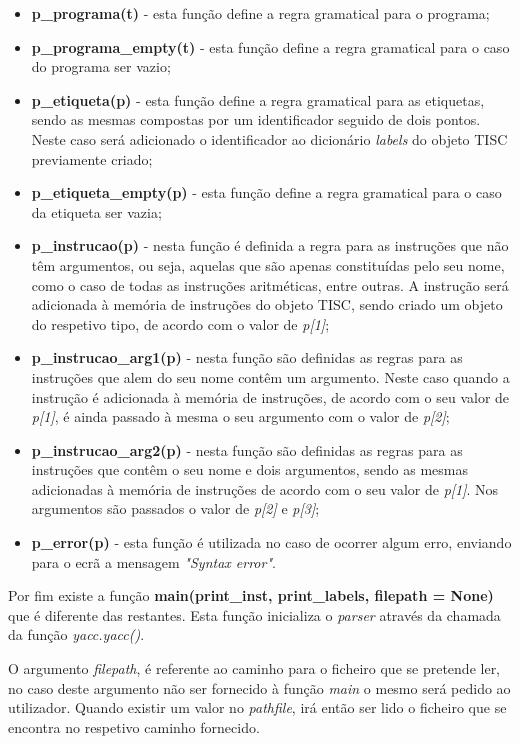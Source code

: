 \documentclass[titlepage,11pt,svgnames]{article}   %
\begin{document}
\begin{itemize}
\item \textbf{p\_programa(t)} - esta função define a regra gramatical para o programa;
\item \textbf{p\_programa\_empty(t)} - esta função define a regra gramatical para o caso do programa ser vazio;
\item \textbf{p\_etiqueta(p)} - esta função define a regra gramatical para as etiquetas, sendo as mesmas compostas por um identificador seguido de dois pontos. Neste caso será adicionado o identificador ao dicionário \textit{labels} do objeto TISC previamente criado;
\item \textbf{p\_etiqueta\_empty(p)} - esta função define a regra gramatical para o caso da etiqueta ser vazia;
\item \textbf{p\_instrucao(p)} - nesta função é definida a regra para as instruções que não têm argumentos, ou seja, aquelas que são apenas constituídas pelo seu nome, como o caso de todas as instruções aritméticas, entre outras. A instrução será adicionada à memória de instruções do objeto TISC, sendo criado um objeto do respetivo tipo, de acordo com o valor de \textit{p[1]};
\item \textbf{p\_instrucao\_arg1(p)} - nesta função são definidas as regras para as instruções que alem do seu nome contêm um argumento. Neste caso quando a instrução é adicionada à memória de instruções, de acordo com o seu valor de \textit{p[1]}, é ainda passado à mesma o seu argumento com o valor de \textit{p[2]};
\item \textbf{p\_instrucao\_arg2(p)} - nesta função são definidas as regras para as instruções que contêm o seu nome e dois argumentos, sendo as mesmas adicionadas à memória de instruções de acordo com o seu valor de \textit{p[1]}. Nos argumentos são passados o valor de \textit{p[2]} e \textit{p[3]};
\item \textbf{p\_error(p)} - esta função é utilizada no caso de ocorrer algum erro, enviando para o ecrã a mensagem \textit{"Syntax error"}.
\end{itemize}

Por fim existe a função \textbf{main(print\_inst, print\_labels, filepath = None)} que é diferente das restantes. Esta função inicializa o \textit{parser} através da chamada da função \textit{yacc.yacc()}. 

O argumento \textit{filepath}, é referente ao caminho para o ficheiro que se pretende ler, no caso deste argumento não ser fornecido à função \textit{main} o mesmo será pedido ao utilizador.
Quando existir um valor no \textit{pathfile}, irá então ser lido o ficheiro que se encontra no respetivo caminho fornecido.
\end{document}
